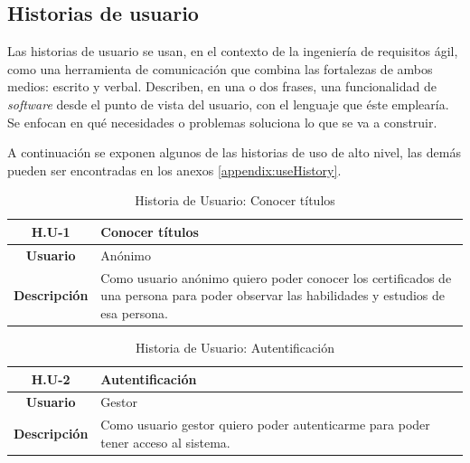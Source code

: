 
\subsection{Historias de usuario}
Las historias de usuario se usan, en el contexto de la ingeniería de requisitos ágil, como una herramienta de comunicación que combina las fortalezas de ambos medios: escrito y verbal. Describen, en una o dos frases, una funcionalidad de \textit{software} desde el punto de vista del usuario, con el lenguaje que éste emplearía. Se enfocan en qué necesidades o problemas soluciona lo que se va a construir.

A continuación se exponen algunos de las historias de uso de alto nivel, las demás pueden ser encontradas en los anexos \ref{appendix:useHistory}.

\begin{table}[!h]
	\begin{center}
		\begin{tabular}{|c|p{10cm}|}
		\hline \textbf{H.U-1} & Conocer títulos \\ 
		\hline \textbf{Usuario} & Anónimo\\ 
		\hline \textbf{Descripción} & Como usuario anónimo quiero poder conocer los certificados de una persona para poder observar las habilidades y estudios de esa persona. \\ 
		\hline 
		\end{tabular}
		\caption{Historia de Usuario: Conocer títulos}
		\label{tab:HU1}
	\end{center}
\end{table}

\begin{table}[!h]
	\begin{center}
		\begin{tabular}{|c|p{10cm}|}
		\hline \textbf{H.U-2} & Autentificación \\ 
		\hline \textbf{Usuario} & Gestor \\ 
		\hline \textbf{Descripción} & Como usuario gestor quiero poder autenticarme para poder tener acceso al sistema. \\ 
		\hline 
		\end{tabular}
		\caption{Historia de Usuario: Autentificación}
		\label{tab:HU2}
	\end{center}
\end{table}


